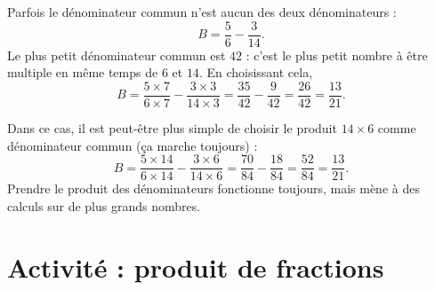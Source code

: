 \begin{example}
    Parfois le dénominateur commun n'est aucun des deux dénominateurs :
    \begin{equation}
        B=\frac{5}{ 6 }-\frac{ 3 }{ 14 }.
    \end{equation}
    Le plus petit dénominateur commun est \( 42\) : c'est le plus petit nombre à être multiple en même temps de \( 6\) et \( 14\). En choisissant cela,
    \begin{equation}
        B=\frac{ 5\times 7 }{ 6\times 7 }-\frac{ 3\times 3 }{ 14\times 3 }=\frac{ 35 }{ 42 }-\frac{ 9 }{ 42 }=\frac{ 26 }{ 42 }=\frac{ 13 }{ 21 }.
    \end{equation}
    
    Dans ce cas, il est peut-être plus simple de choisir le produit \( 14\times 6\) comme dénominateur commun (ça marche toujours) :
    \begin{equation}
        B=\frac{ 5\times 14 }{ 6\times 14 }-\frac{ 3\times 6 }{ 14\times 6 }=\frac{ 70 }{ 84 }-\frac{ 18 }{ 84 }=\frac{ 52 }{ 84 }=\frac{ 13 }{ 21 }.
    \end{equation}
    Prendre le produit des dénominateurs fonctionne toujours, mais mène à des calculs sur de plus grands nombres.    
\end{example}

\section*{Activité : produit de fractions}




